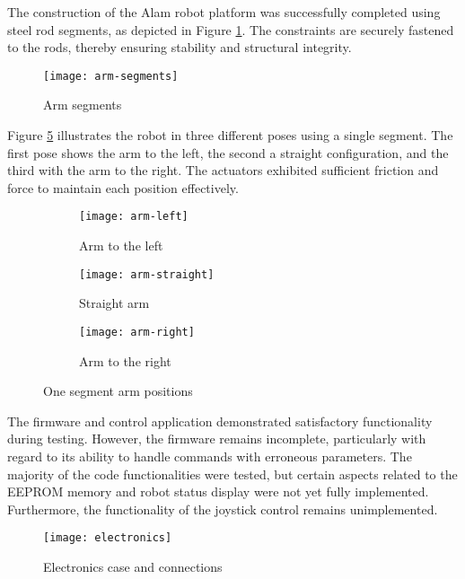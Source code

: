 The construction of the Alam robot platform was successfully completed using steel rod segments, as depicted in Figure \ref{fig:arm-segments}. The constraints are securely fastened to the rods, thereby ensuring stability and structural integrity.

\begin{figure}[H]
    \centering
    \texttt{[image: arm-segments]}
    \caption{Arm segments}
    \label{fig:arm-segments}
\end{figure}

Figure \ref{fig:arm-positions} illustrates the robot in three different poses using a single segment. The first pose shows the arm to the left, the second a straight configuration, and the third with the arm to the right. The actuators exhibited sufficient friction and force to maintain each position effectively.

\begin{figure}[H]
    \centering
    \begin{subfigure}[b]{0.3\textwidth}
        \texttt{[image: arm-left]}
        \caption{Arm to the left}
        \label{fig:arm-left}
    \end{subfigure}
    \begin{subfigure}[b]{0.3\textwidth}
        \texttt{[image: arm-straight]}
        \caption{Straight arm}
        \label{fig:arm-straight}
    \end{subfigure}
    \begin{subfigure}[b]{0.3\textwidth}
        \texttt{[image: arm-right]}
        \caption{Arm to the right}
        \label{fig:arm-right}
    \end{subfigure}
    \caption{One segment arm positions}
    \label{fig:arm-positions}
\end{figure}

The firmware and control application demonstrated satisfactory functionality during testing. However, the firmware remains incomplete, particularly with regard to its ability to handle commands with erroneous parameters. The majority of the code functionalities were tested, but certain aspects related to the EEPROM memory and robot status display were not yet fully implemented. Furthermore, the functionality of the joystick control remains unimplemented.

\begin{figure}[H]
    \centering
    \texttt{[image: electronics]}
    \caption{Electronics case and connections}
    \label{fig:electronics}
\end{figure}


